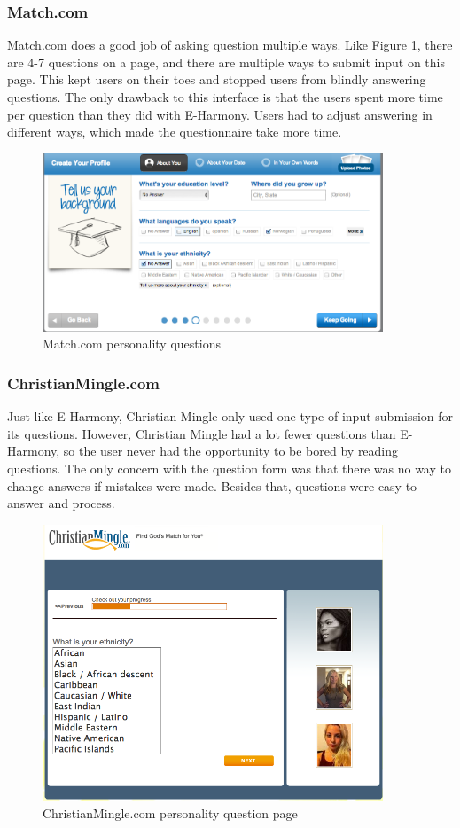 \documentclass{article}
\begin{document}
\subsubsection{Match.com}
Match.com does a good job of asking question multiple ways. Like Figure \ref{Match1}, there are 4-7 questions on a page, and there are multiple ways to submit input on this page. This kept users on their toes and stopped users from blindly answering questions. The only drawback to this interface is that the users spent more time per question than they did with E-Harmony. Users had to adjust answering in different ways, which made the questionnaire take more time.  

\begin{figure}
\centering
\includegraphics[width=4in]{Match1.png} 

\caption{Match.com personality questions}
\label{Match1}
\end{figure}

\subsubsection{ChristianMingle.com}
Just like E-Harmony, Christian Mingle only used one type of input submission for its questions. However, Christian Mingle had a lot fewer questions than E-Harmony, so the user never had the opportunity to be bored by reading questions. The only concern with the question form was that there was no way to change answers if mistakes were made. Besides that, questions were easy to answer and process.

\begin{figure}
\centering
\includegraphics[width=4in]{CM1.png} 

\caption{ChristianMingle.com personality question page}
\label{CM1}
\end{figure}
\end{document}
